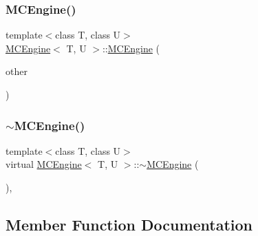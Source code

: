 \subsubsection{\texorpdfstring{M\+C\+Engine()}{MCEngine()}\hspace{0.1cm}{\footnotesize\ttfamily [4/4]}}
{\footnotesize\ttfamily template$<$class T, class U$>$ \\
\hyperlink{classMCEngine}{M\+C\+Engine}$<$ T, U $>$\+::\hyperlink{classMCEngine}{M\+C\+Engine} (\begin{DoxyParamCaption}\item[{const \hyperlink{classMCEngine}{M\+C\+Engine}$<$ T, U $>$ \&}]{other }\end{DoxyParamCaption})\hspace{0.3cm}{\ttfamily [inline]}}

\hypertarget{classMCEngine_a9e6d34c928e8a7c7fd3cf25efc18a56a}{}\label{classMCEngine_a9e6d34c928e8a7c7fd3cf25efc18a56a} 
\subsubsection{\texorpdfstring{$\sim$\+M\+C\+Engine()}{~MCEngine()}}
{\footnotesize\ttfamily template$<$class T, class U$>$ \\
virtual \hyperlink{classMCEngine}{M\+C\+Engine}$<$ T, U $>$\+::$\sim$\hyperlink{classMCEngine}{M\+C\+Engine} (\begin{DoxyParamCaption}{ }\end{DoxyParamCaption})\hspace{0.3cm}{\ttfamily [inline]}, {\ttfamily [virtual]}}



\subsection{Member Function Documentation}
\hypertarget{classMCEngine_a15873abff351cca971b1154f7ffe40b5}{}\label{classMCEngine_a15873abff351cca971b1154f7ffe40b5} 
